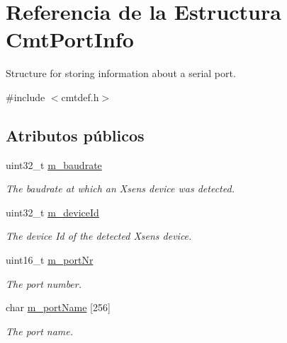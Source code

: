 \hypertarget{structCmtPortInfo}{\section{\-Referencia de la \-Estructura \-Cmt\-Port\-Info}
\label{structCmtPortInfo}
}


\-Structure for storing information about a serial port.  




{\ttfamily \#include $<$cmtdef.\-h$>$}

\subsection*{\-Atributos públicos}
\begin{DoxyCompactItemize}
\item 
\hypertarget{structCmtPortInfo_a5221308aa919a0bbab764092562826e4}{uint32\-\_\-t \hyperlink{structCmtPortInfo_a5221308aa919a0bbab764092562826e4}{m\-\_\-baudrate}}\label{structCmtPortInfo_a5221308aa919a0bbab764092562826e4}

\begin{DoxyCompactList}\small\item\em \-The baudrate at which an \-Xsens device was detected. \end{DoxyCompactList}\item 
\hypertarget{structCmtPortInfo_a1cbdaa3c11c0b8376cd4e67ccde4dcee}{uint32\-\_\-t \hyperlink{structCmtPortInfo_a1cbdaa3c11c0b8376cd4e67ccde4dcee}{m\-\_\-device\-Id}}\label{structCmtPortInfo_a1cbdaa3c11c0b8376cd4e67ccde4dcee}

\begin{DoxyCompactList}\small\item\em \-The device \-Id of the detected \-Xsens device. \end{DoxyCompactList}\item 
\hypertarget{structCmtPortInfo_a80827f7543618e6b606f700b1e9f05be}{uint16\-\_\-t \hyperlink{structCmtPortInfo_a80827f7543618e6b606f700b1e9f05be}{m\-\_\-port\-Nr}}\label{structCmtPortInfo_a80827f7543618e6b606f700b1e9f05be}

\begin{DoxyCompactList}\small\item\em \-The port number. \end{DoxyCompactList}\item 
\hypertarget{structCmtPortInfo_a0b92e9db1f36f05f6078341e9acad8f7}{char \hyperlink{structCmtPortInfo_a0b92e9db1f36f05f6078341e9acad8f7}{m\-\_\-port\-Name} \mbox{[}256\mbox{]}}\label{structCmtPortInfo_a0b92e9db1f36f05f6078341e9acad8f7}

\begin{DoxyCompactList}\small\item\em \-The port name. \end{DoxyCompactList}\end{DoxyCompactItemize}


